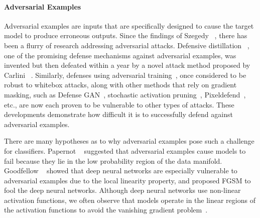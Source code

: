 \documentclass[final]{cvpr}
\begin{document}
\paragraph{Adversarial Examples}

Adversarial examples are inputs that are specifically designed to cause the target model to produce erroneous outputs. 
Since the findings of Szegedy \etal~\cite{Szegedy2013-jl}, there has been a flurry of research addressing adversarial attacks. Defensive distillation ~\cite{DBLP:journals/corr/PapernotMWJS15}, one of the promising defense mechanisms against adversarial examples, was invented but then defeated within a year by a novel attack method proposed by Carlini \etal~\cite{7958570}. Similarly, defenses using adversarial training~\cite{46638}, once considered to be robust to whitebox attacks, along with other methods that rely on gradient masking, such as Defense GAN~\cite{samangouei2018defensegan}, stochastic activation pruning~\cite{s.2018stochastic}, Pixeldefend~\cite{song2018pixeldefend}, etc., are now each proven to be vulnerable to other types of attacks. These developments demonstrate how difficult it is to successfully defend against adversarial examples.

There are many hypotheses as to why adversarial examples pose such a challenge for classifiers. Papernot \etal~\cite{DBLP:journals/corr/PapernotMG16} suggested that adversarial examples cause models to fail because they lie in the low probability region of the data manifold. Goodfellow \etal~\cite{Goodfellow2014-rh} showed that deep neural networks are especially vulnerable to adversarial examples due to the local linearity property, and proposed FGSM to fool the deep neural networks. Although deep neural networks use non-linear activation functions, we often observe that models operate in the linear regions of the activation functions to avoid the vanishing gradient problem~\cite{hochreiter98}. 
\end{document}
